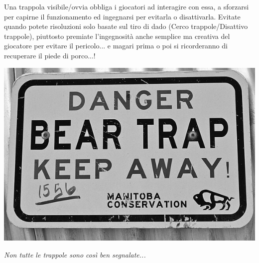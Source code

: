 \bigskip

\begin{narratore}
Una trappola visibile/ovvia obbliga i giocatori ad interagire con essa, a sforzarsi per capirne il funzionamento ed ingegnarsi per evitarla o disattivarla. Evitate quando potete risoluzioni solo basate sul tiro di dado (Cerco trappole/Disattivo trappole), piuttosto premiate l'ingegnosità anche semplice ma creativa del giocatore per evitare il pericolo... e magari prima o poi si ricorderanno di recuperare il piede di porco...!
\end{narratore}

\vfill

\begin{center}
	\includegraphics[width=0.65\linewidth]{immagini/Bear_trap.png}

	\emph{Non tutte le trappole sono così ben segnalate...}
\end{center}

\pagebreak

